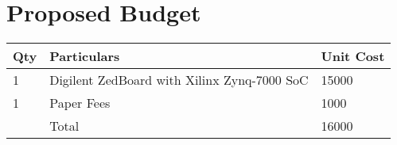 
\chapter{Proposed Budget} %

\label{AppendixB} %


\begin{tabular}{ | l | l | l | }
	\hline
	Qty & Particulars & Unit Cost \\ \hline
	1 & Digilent ZedBoard with Xilinx Zynq-7000 SoC & 15000 \\ \hline
	1 & Paper Fees & 1000 \\ \hline
	& Total & 16000 \\ \hline
\end{tabular}
